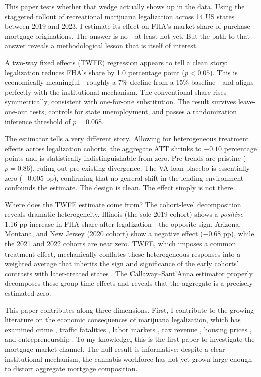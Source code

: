 \documentclass[12pt]{article}
\begin{document}
This paper tests whether that wedge actually shows up in the data. Using the staggered rollout of recreational marijuana legalization across 14 US states between 2019 and 2023, I estimate its effect on FHA's market share of purchase mortgage originations. The answer is no---at least not yet. But the path to that answer reveals a methodological lesson that is itself of interest.

A two-way fixed effects (TWFE) regression appears to tell a clean story: legalization reduces FHA's share by 1.0 percentage point ($p < 0.05$). This is economically meaningful---roughly a 7\% decline from a 15\% baseline---and aligns perfectly with the institutional mechanism. The conventional share rises symmetrically, consistent with one-for-one substitution. The result survives leave-one-out tests, controls for state unemployment, and passes a randomization inference threshold of $p = 0.068$.

The \citet{callaway2021} estimator tells a very different story. Allowing for heterogeneous treatment effects across legalization cohorts, the aggregate ATT shrinks to $-0.10$ percentage points and is statistically indistinguishable from zero. Pre-trends are pristine ($p = 0.86$), ruling out pre-existing divergence. The VA loan placebo is essentially zero ($-0.005$ pp), confirming that no general shift in the lending environment confounds the estimate. The design is clean. The effect simply is not there.

Where does the TWFE estimate come from? The cohort-level decomposition reveals dramatic heterogeneity. Illinois (the sole 2019 cohort) shows a \textit{positive} 1.16 pp increase in FHA share after legalization---the opposite sign. Arizona, Montana, and New Jersey (2020 cohort) show a negative effect ($-0.68$ pp), while the 2021 and 2022 cohorts are near zero. TWFE, which imposes a common treatment effect, mechanically conflates these heterogeneous responses into a weighted average that inherits the sign and significance of the early cohorts' contrasts with later-treated states \citep{goodman-bacon2021}. The Callaway--Sant'Anna estimator properly decomposes these group-time effects and reveals that the aggregate is a precisely estimated zero.

This paper contributes along three dimensions. First, I contribute to the growing literature on the economic consequences of marijuana legalization, which has examined crime \citep{gavrilova2019, dragone2019}, traffic fatalities \citep{anderson2013, hansen2020}, labor markets \citep{nicholas2024, ullman2017}, tax revenue \citep{caulkins2022}, housing prices \citep{cheng2018, shanti2024}, and entrepreneurship \citep{chakraborty2024}. To my knowledge, this is the first paper to investigate the mortgage market channel. The null result is informative: despite a clear institutional mechanism, the cannabis workforce has not yet grown large enough to distort aggregate mortgage composition.
\end{document}
